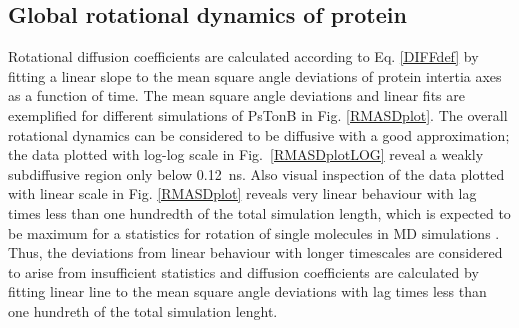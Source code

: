 \documentclass[pre,aps,floatfix,authordate1-4,twocolumn]{revtex4-1}
\begin{document}
\subsection{Global rotational dynamics of protein}
Rotational diffusion coefficients are calculated
according to Eq. \ref{DIFFdef} by fitting a
linear slope to the mean square angle deviations of protein intertia
axes as a function of time. The mean square angle deviations
and linear fits are exemplified for different simulations of PsTonB
in Fig. \ref{RMASDplot}. The overall rotational dynamics can be considered
to be diffusive with a good approximation; the data plotted with
log-log scale in Fig.~\ref{RMASDplotLOG} reveal a weakly subdiffusive region
only below 0.12~ns. Also visual inspection of the data plotted with
linear scale in Fig. \ref{RMASDplot} reveals very linear behaviour
with lag times less than one hundredth of the total simulation length,
which is expected to be maximum for a statistics for rotation of single molecules
in MD simulations \cite{lu06}. Thus, the deviations from linear behaviour with
longer timescales are considered to arise from insufficient statistics
and diffusion coefficients are calculated by fitting linear line to the mean square angle deviations with
lag times less than one hundreth of the total simulation lenght.
\end{document}
